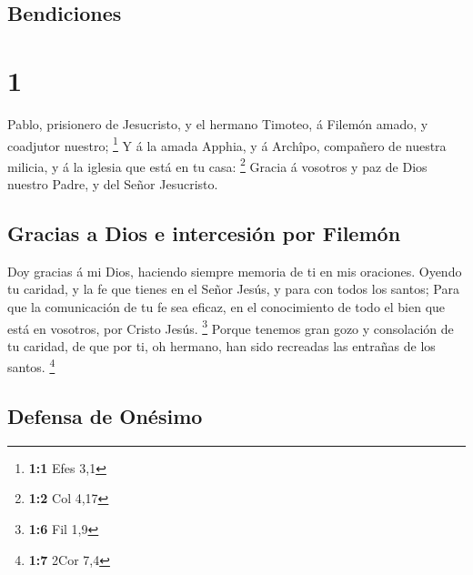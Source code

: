 \hypertarget{bendiciones}{%
\subsection{Bendiciones}\label{bendiciones}}

\hypertarget{section}{%
\section{1}\label{section}}

 Pablo, prisionero de Jesucristo, y el hermano Timoteo, á
Filemón amado, y coadjutor nuestro; \footnote{\textbf{1:1} Efes 3,1}
 Y á la amada Apphia, y á Archîpo, compañero de nuestra
milicia, y á la iglesia que está en tu casa: \footnote{\textbf{1:2} Col
  4,17}  Gracia á vosotros y paz de Dios nuestro Padre, y
del Señor Jesucristo.

\hypertarget{gracias-a-dios-e-intercesiuxf3n-por-filemuxf3n}{%
\subsection{Gracias a Dios e intercesión por
Filemón}\label{gracias-a-dios-e-intercesiuxf3n-por-filemuxf3n}}

 Doy gracias á mi Dios, haciendo siempre memoria de ti en
mis oraciones.  Oyendo tu caridad, y la fe que tienes en el
Señor Jesús, y para con todos los santos;  Para que la
comunicación de tu fe sea eficaz, en el conocimiento de todo el bien que
está en vosotros, por Cristo Jesús. \footnote{\textbf{1:6} Fil 1,9}
 Porque tenemos gran gozo y consolación de tu caridad, de
que por ti, oh hermano, han sido recreadas las entrañas de los santos.
\footnote{\textbf{1:7} 2Cor 7,4}

\hypertarget{defensa-de-onuxe9simo}{%
\subsection{Defensa de Onésimo}\label{defensa-de-onuxe9simo}}

